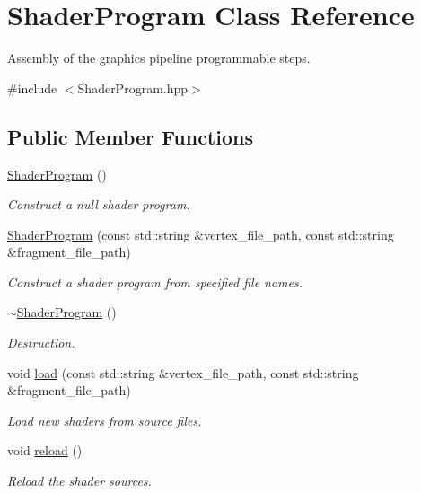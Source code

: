 \hypertarget{classShaderProgram}{\section{Shader\+Program Class Reference}
\label{classShaderProgram}
}


Assembly of the graphics pipeline programmable steps.  




{\ttfamily \#include $<$Shader\+Program.\+hpp$>$}

\subsection*{Public Member Functions}
\begin{DoxyCompactItemize}
\item 
\hyperlink{classShaderProgram_add585b75cb78f4afa865ea7b27c9651e}{Shader\+Program} ()
\begin{DoxyCompactList}\small\item\em Construct a null shader program. \end{DoxyCompactList}\item 
\hyperlink{classShaderProgram_a170d96b836366ed4fac26809f186ce56}{Shader\+Program} (const std\+::string \&vertex\+\_\+file\+\_\+path, const std\+::string \&fragment\+\_\+file\+\_\+path)
\begin{DoxyCompactList}\small\item\em Construct a shader program from specified file names. \end{DoxyCompactList}\item 
\hyperlink{classShaderProgram_a2d2eadcfc48cc2e2ddb82aba70553a9f}{$\sim$\+Shader\+Program} ()
\begin{DoxyCompactList}\small\item\em Destruction. \end{DoxyCompactList}\item 
void \hyperlink{classShaderProgram_afd2ba7e70028a58d2bf74443253374fa}{load} (const std\+::string \&vertex\+\_\+file\+\_\+path, const std\+::string \&fragment\+\_\+file\+\_\+path)
\begin{DoxyCompactList}\small\item\em Load new shaders from source files. \end{DoxyCompactList}\item 
void \hyperlink{classShaderProgram_a007cebbd8a26ef27ab136452c3774899}{reload} ()
\begin{DoxyCompactList}\small\item\em Reload the shader sources. \end{DoxyCompactList}\item 

\end{DoxyCompactItemize}
